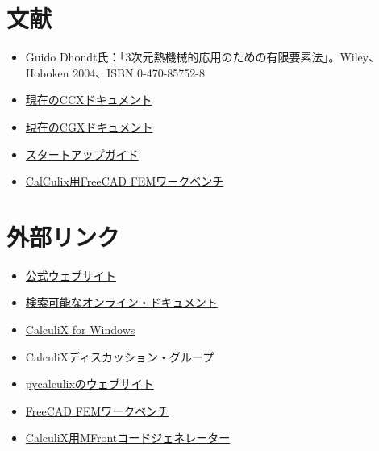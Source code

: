 \documentclass[a4j,12pt,twoside,openany]{ltjsarticle}
\begin{document}
\section{文献}\label{sec:Literature}

\begin{itemize}
	\item Guido Dhondt氏：「3次元熱機械的応用のための有限要素法」。Wiley、Hoboken 2004、ISBN 0-470-85752-8
	\item \href{http://bconverged.com/calculix/doc/ccx/html/ccx.html}{現在のCCXドキュメント}
	\item \href{http://bconverged.com/calculix/doc/cgx/html/cgx.html}{現在のCGXドキュメント}
	\item \href{http://www.bconverged.com/content/calculix/doc/GettingStarted.pdf}{スタートアップガイド}
	\item \href{https://freecadweb.org/wiki/FEM_Module}{CalCulix用FreeCAD FEMワークベンチ}
\end{itemize}

\section{外部リンク}\label{sec:References}

\begin{itemize}
	\item \href{http://www.calculix.de/}{公式ウェブサイト}
	\item \href{http://www.feacluster.com/calculix.php\#1}{検索可能なオンライン・ドキュメント}
	\item \href{http://bconverged.com/calculix}{CalculiX for Windows}
	\item CalculiXディスカッション・グループ
	\item \href{http://justinablack.com/pycalculix/}{pycalculixのウェブサイト}
	\item \href{https://forum.freecadweb.org/viewtopic.php?f=18\&t=12212}{FreeCAD FEMワークベンチ}
	\item \href{http://tfel.sourceforge.net/calculix.html}{CalculiX用MFrontコードジェネレーター}
\end{itemize}
\end{document}
